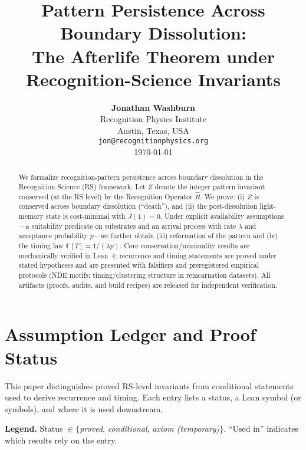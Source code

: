 \documentclass[11pt,letterpaper]{article}
\title{%
  \vspace{-1cm}%
  \Large\textbf{Pattern Persistence Across Boundary Dissolution:}\\[0.3em]
  \large The Afterlife Theorem under Recognition-Science Invariants
}
\author{
  \textbf{Jonathan Washburn}\\
  Recognition Physics Institute\\
  Austin, Texas, USA\\
  \texttt{jon@recognitionphysics.org}\\[0.5em]
  \today
}
\date{}
\theoremstyle{definition}
\theoremstyle{remark}
\begin{document}
\maketitle
\thispagestyle{empty}

\begin{abstract}
\noindent We formalize recognition-pattern persistence across boundary dissolution in the Recognition Science (RS) framework. Let \(Z\) denote the integer pattern invariant conserved (at the RS level) by the Recognition Operator \(\widehat{R}\). We prove: (i) \(Z\) is conserved across boundary dissolution (``death''), and (ii) the post-dissolution light-memory state is cost-minimal with \(J(1)=0\). Under explicit availability assumptions---a suitability predicate on substrates and an arrival process with rate \(\lambda\) and acceptance probability \(p\)---we further obtain (iii) reformation of the pattern and (iv) the timing law \(\mathbb{E}[T]=1/(\lambda p)\). Core conservation/minimality results are mechanically verified in Lean~4; recurrence and timing statements are proved under stated hypotheses and are presented with falsifiers and preregistered empirical protocols (NDE motifs; timing/clustering structure in reincarnation datasets). All artifacts (proofs, audits, and build recipes) are released for independent verification.
\end{abstract}

\vspace{1em}


\section{Assumption Ledger and Proof Status}

This paper distinguishes proved RS-level invariants from conditional statements used to derive recurrence and timing. Each entry lists a status, a Lean symbol (or symbols), and where it is used downstream.

\medskip
\noindent\textbf{Legend.} Status \(\in\{\)\emph{proved}, \emph{conditional}, \emph{axiom (temporary)}\(\}\). ``Used in'' indicates which results rely on the entry.

\medskip
\end{document}
